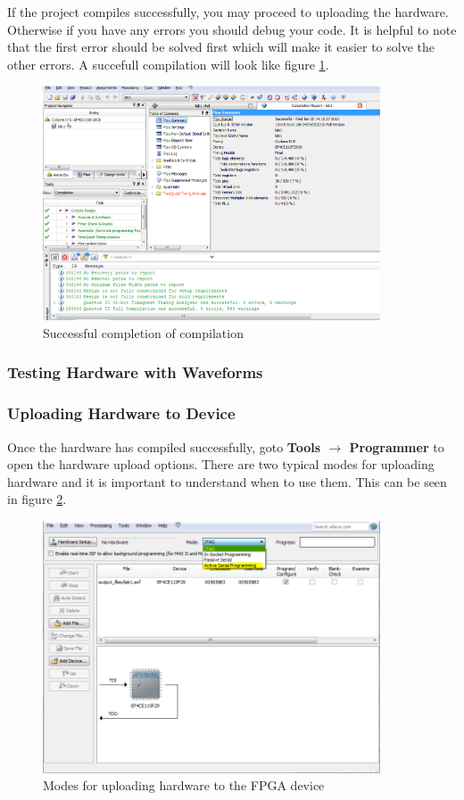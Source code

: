 If the project compiles successfully, you may proceed to uploading the hardware. Otherwise if you have any errors you should debug your code. It is helpful to note that the first error should be solved first which will make it easier to solve the other errors. A succefull compilation will look like figure \ref{fig:compileresuts}.

\begin{figure}[H]
	\centering
	\includegraphics[width=100mm]{Lab1/figures/compileresults.png}
	\caption{Successful completion of compilation}
	\label{fig:compileresuts}
\end{figure}

\subsubsection{Testing Hardware with Waveforms}


\subsubsection{Uploading Hardware to Device}

Once the hardware has compiled successfully, goto {\bf Tools $\rightarrow$ Programmer} to open the hardware upload options. There are two typical modes for uploading hardware and it is important to understand when to use them. This can be seen in figure \ref{fig:uploadmethod}.


\begin{figure}[H]
	\centering
	\includegraphics[width=100mm]{Lab1/figures/uploadmethod.png}
	\caption{Modes for uploading hardware to the FPGA device}
	\label{fig:uploadmethod}
\end{figure}

